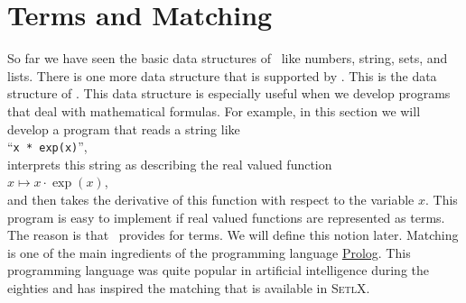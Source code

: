 \section{Terms and Matching}
So far we have seen the basic data structures of \setlx\ like numbers, string, sets, and lists.
There is one more data structure that is supported by \setlx.  This is the data structure of
\colorbox{amethyst}{}.  
This data structure is especially useful when we develop programs that deal with mathematical formulas.
For example, in this section we will develop a program that reads a string like 
\\[0.2cm]
\hspace*{1.3cm}
``\texttt{x * exp(x)}'',
\\[0.2cm]
interprets this string as describing the real valued function 
\\[0.2cm]
\hspace*{1.3cm}
$x \mapsto x \cdot \exp(x)$, 
\\[0.2cm]
and then takes the derivative of this function with respect to the variable $x$.  This program is
easy to implement if real valued functions are represented as terms.  The reason is that \setlx\ provides 
\colorbox{amethyst}{} for terms.  We will define this notion later.  Matching
is one of the main ingredients of the programming language \href{https://en.wikipedia.org/wiki/Prolog}{Prolog}.
This programming language was quite popular in artificial intelligence during the eighties and has
inspired the matching that is available in \textsc{SetlX}.


